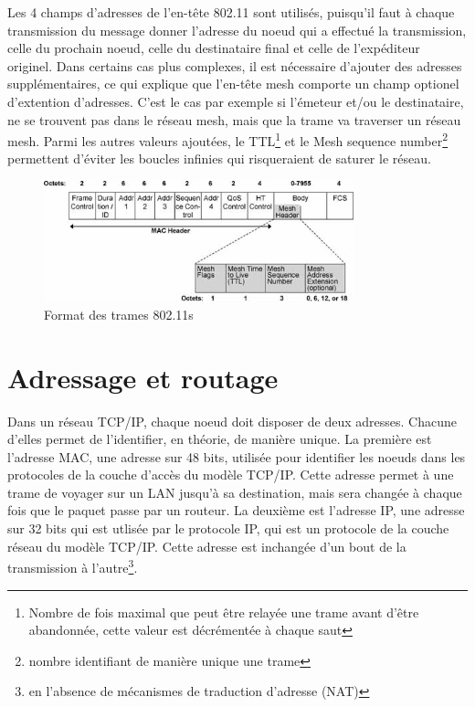 Les 4 champs d'adresses de l'en-tête 802.11 sont utilisés, puisqu'il faut à chaque transmission du message donner l'adresse
du noeud qui a effectué la transmission, celle du prochain noeud, celle du destinataire final et celle de l'expéditeur originel. 
Dans certains cas plus complexes, il est nécessaire d'ajouter des adresses supplémentaires, ce qui explique que l'en-tête mesh
comporte un champ optionel d'extention d'adresses. C'est le cas par exemple si l'émeteur et/ou le destinataire, ne se trouvent pas
dans le réseau mesh, mais que la trame va traverser un réseau mesh. Parmi les autres valeurs ajoutées, le TTL\footnote{Nombre de
fois maximal que peut être relayée une trame avant d'être abandonnée, cette valeur est décrémentée à chaque saut} et le Mesh sequence
number\footnote{nombre identifiant de manière unique une trame} permettent d'éviter les boucles infinies qui risqueraient de saturer
le réseau.


\begin{figure}
   \centering
   \includegraphics[width=0.8\textwidth,natwidth=488,natheight=513]{images/mesh_header.jpeg}
   \caption{Format des trames 802.11s}
\end{figure}

\section{Adressage et routage}

Dans un réseau TCP/IP, chaque noeud doit disposer de deux adresses. Chacune d'elles permet de l'identifier, en théorie, de manière 
unique. La première est l'adresse MAC, une adresse sur 48 bits, utilisée pour identifier les noeuds dans les protocoles de la 
couche d'accès du modèle TCP/IP. Cette adresse permet à une trame de voyager sur un LAN jusqu'à sa destination, mais sera changée
à chaque fois que le paquet passe par un routeur. La deuxième est l'adresse IP, une adresse sur 32 bits qui est utlisée par le
protocole IP, qui est un protocole de la couche réseau du modèle TCP/IP. Cette adresse est inchangée d'un bout de la transmission
à l'autre\footnote{en l'absence de mécanismes de traduction d'adresse (NAT)}.

